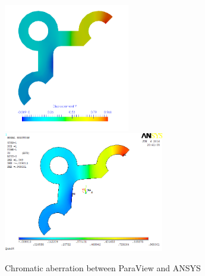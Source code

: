 \begin{figure}[htbp]
	\begin{center}
		\includegraphics[width=5.5cm,clip]{ParaViewColor.png} 	
		\includegraphics[width=7cm,clip]{ANSYSColor.png} 	
		\caption{Chromatic aberration between ParaView and ANSYS} \label{fig: Color}
	\end{center}
\end{figure}
\clearpage 

